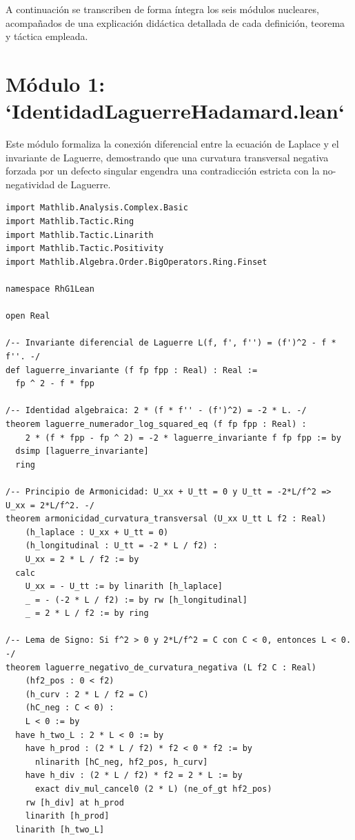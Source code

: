 \documentclass[11pt,a4paper]{article}
\theoremstyle{definition}
\theoremstyle{remark}
\begin{document}
A continuación se transcriben de forma íntegra los seis módulos nucleares, acompañados de una explicación didáctica detallada de cada definición, teorema y táctica empleada.

\section{Módulo 1: `IdentidadLaguerreHadamard.lean`}

Este módulo formaliza la conexión diferencial entre la ecuación de Laplace y el invariante de Laguerre, demostrando que una curvatura transversal negativa forzada por un defecto singular engendra una contradicción estricta con la no-negatividad de Laguerre.

\begin{lstlisting}[language=Lean4]
import Mathlib.Analysis.Complex.Basic
import Mathlib.Tactic.Ring
import Mathlib.Tactic.Linarith
import Mathlib.Tactic.Positivity
import Mathlib.Algebra.Order.BigOperators.Ring.Finset

namespace RhG1Lean

open Real

/-- Invariante diferencial de Laguerre L(f, f', f'') = (f')^2 - f * f''. -/
def laguerre_invariante (f fp fpp : Real) : Real :=
  fp ^ 2 - f * fpp

/-- Identidad algebraica: 2 * (f * f'' - (f')^2) = -2 * L. -/
theorem laguerre_numerador_log_squared_eq (f fp fpp : Real) :
    2 * (f * fpp - fp ^ 2) = -2 * laguerre_invariante f fp fpp := by
  dsimp [laguerre_invariante]
  ring

/-- Principio de Armonicidad: U_xx + U_tt = 0 y U_tt = -2*L/f^2 => U_xx = 2*L/f^2. -/
theorem armonicidad_curvatura_transversal (U_xx U_tt L f2 : Real)
    (h_laplace : U_xx + U_tt = 0)
    (h_longitudinal : U_tt = -2 * L / f2) :
    U_xx = 2 * L / f2 := by
  calc
    U_xx = - U_tt := by linarith [h_laplace]
    _ = - (-2 * L / f2) := by rw [h_longitudinal]
    _ = 2 * L / f2 := by ring

/-- Lema de Signo: Si f^2 > 0 y 2*L/f^2 = C con C < 0, entonces L < 0. -/
theorem laguerre_negativo_de_curvatura_negativa (L f2 C : Real)
    (hf2_pos : 0 < f2)
    (h_curv : 2 * L / f2 = C)
    (hC_neg : C < 0) :
    L < 0 := by
  have h_two_L : 2 * L < 0 := by
    have h_prod : (2 * L / f2) * f2 < 0 * f2 := by
      nlinarith [hC_neg, hf2_pos, h_curv]
    have h_div : (2 * L / f2) * f2 = 2 * L := by
      exact div_mul_cancel0 (2 * L) (ne_of_gt hf2_pos)
    rw [h_div] at h_prod
    linarith [h_prod]
  linarith [h_two_L]


\end{lstlisting}
\end{document}
